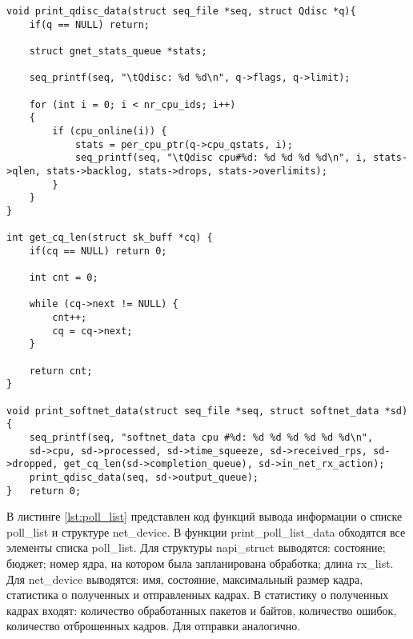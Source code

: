 \begin{center}
	\captionsetup{justification=raggedright,singlelinecheck=off}
	\begin{lstlisting}[label=lst:softnet_data_imp,caption=Функции вывода информации о структуре softnet\_data и Qdisc ,showstringspaces=false]
void print_qdisc_data(struct seq_file *seq, struct Qdisc *q){
	if(q == NULL) return;
	
	struct gnet_stats_queue *stats;
	
	seq_printf(seq, "\tQdisc: %d %d\n", q->flags, q->limit);
	
	for (int i = 0; i < nr_cpu_ids; i++)
	{
		if (cpu_online(i)) {
			stats = per_cpu_ptr(q->cpu_qstats, i);
			seq_printf(seq, "\tQdisc cpu#%d: %d %d %d %d\n", i, stats->qlen, stats->backlog, stats->drops, stats->overlimits);
		}
	}
}

int get_cq_len(struct sk_buff *cq) {
	if(cq == NULL) return 0;
	
	int cnt = 0;
	
	while (cq->next != NULL) {
		cnt++;
		cq = cq->next;
	}
	
	return cnt;
}

void print_softnet_data(struct seq_file *seq, struct softnet_data *sd){
	seq_printf(seq, "softnet_data cpu #%d: %d %d %d %d %d %d\n", 
	sd->cpu, sd->processed, sd->time_squeeze, sd->received_rps, sd->dropped, get_cq_len(sd->completion_queue), sd->in_net_rx_action);
	print_qdisc_data(seq, sd->output_queue);
}	return 0;
	\end{lstlisting}
\end{center}
\FloatBarrier

В листинге \ref{lst:poll_list} представлен код функций вывода информации о списке poll\_list и структуре net\_device. В функции print\_poll\_list\_data обходятся все элементы списка poll\_list. Для структуры napi\_struct выводятся: состояние; бюджет; номер ядра, на котором была запланирована обработка; длина rx\_list. Для net\_device выводятся: имя, состояние, максимальный размер кадра, статистика о полученных и отправленных кадрах. В статистику о полученных кадрах входят: количество обработанных пакетов и байтов, количество ошибок, количество отброшенных кадров. Для отправки аналогично.

